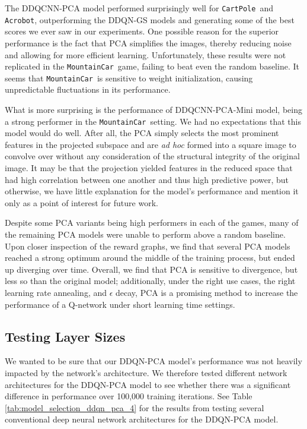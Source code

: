 \documentclass[11pt]{article}
\newcommand{\cp}{\texttt{CartPole}}
\newcommand{\ab}{\texttt{Acrobot}}
\newcommand{\mc}{\texttt{MountainCar}}
\begin{document}
The DDQCNN-PCA model performed surprisingly well for \cp~and \ab, outperforming the DDQN-GS models and generating some of the best scores we ever saw in our experiments. One possible reason for the superior performance is the fact that PCA simplifies the images, thereby reducing noise and allowing for more efficient learning. Unfortunately, these results were not replicated in the \mc~game, failing to beat even the random baseline. It seems that \mc~is sensitive to weight initialization, causing unpredictable fluctuations in its performance.

What is more surprising is the performance of DDQCNN-PCA-Mini model, being a strong performer in the \mc~setting. We had no expectations that this model would do well. After all, the PCA simply selects the most prominent features in the projected subspace and are \textit{ad hoc} formed into a square image to convolve over without any consideration of the structural integrity of the original image. It may be that the projection yielded features in the reduced space that had high correlation between one another and thus high predictive power, but otherwise, we have little explanation for the model's performance and mention it only as a point of interest for future work. 

Despite some PCA variants being high performers in each of the games, many of the remaining PCA models were unable to perform above a random baseline. Upon closer inspection of the reward graphs, we find that several PCA models reached a strong optimum around the middle of the training process, but ended up diverging over time. Overall, we find that PCA is sensitive to divergence, but less so than the original model; additionally, under the right use cases, the right learning rate annealing, and $\epsilon$ decay, PCA is a promising method to increase the performance of a Q-network under short learning time settings.

\subsection{Testing Layer Sizes}

We wanted to be sure that our DDQN-PCA model's performance was not heavily impacted by the network's architecture. We therefore tested different network architectures for the DDQN-PCA model to see whether there was a significant difference in performance over 100,000 training iterations. See Table \ref{tab:model_selection_ddqn_pca_4} for the results from testing several conventional deep neural network architectures for the DDQN-PCA model.
\end{document}
